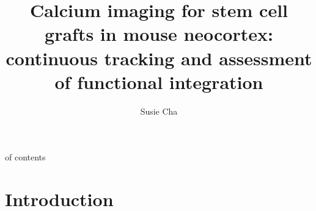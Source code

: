 \title{Calcium imaging for stem cell grafts in mouse neocortex: continuous tracking and assessment of functional integration}
\author{Susie Cha}


\maketitle
\table of contents
\section{Introduction}